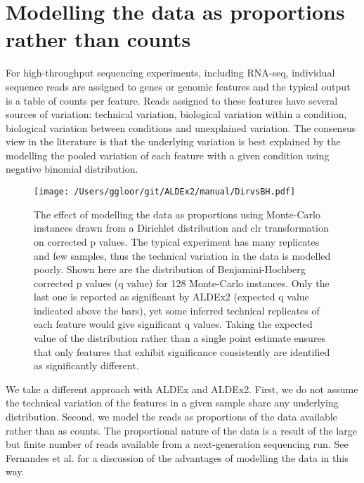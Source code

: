 \documentclass[11pt]{amsart}
\begin{document}
\section{Modelling the data as proportions rather than counts}
For high-throughput sequencing experiments, including RNA-seq, individual sequence reads are assigned to genes or genomic features and the typical output is a table of counts per feature. Reads assigned to these features have several sources of variation: technical variation, biological variation within a condition, biological variation between conditions and unexplained variation. The consensus view in the literature is that the underlying variation is best explained by the modelling the pooled variation of each feature with a given condition using negative binomial distribution. 
\begin{wrapfigure}{r}{0.3\textwidth}\vspace{-1cm}
\vspace{0cm}
\begin{center}
\texttt{[image: /Users/ggloor/git/ALDEx2/manual/DirvsBH.pdf]}
\caption{The effect of modelling the data as proportions using Monte-Carlo instances drawn from a Dirichlet distribution and clr transformation on corrected p values. The typical experiment has many replicates and few samples, thus the technical variation in the data is modelled poorly. Shown here are the distribution of Benjamini-Hochberg corrected p values (q value) for 128 Monte-Carlo instances. Only the last one is reported as significant by ALDEx2 (expected q value indicated above the bars), yet some inferred technical replicates of each feature would give significant q values. Taking the expected value of the distribution rather than a single point estimate ensures that only features that exhibit significance consistently are identified as significantly different.  }
\label{dirvsbh}
\end{center}\vspace{-.5cm}
\end{wrapfigure}
We take a different approach with ALDEx and ALDEx2. First, we do not assume the technical variation of the features in a given sample share any underlying distribution. Second, we model the reads as proportions  of the data available rather than as counts. The proportional nature of the data is a result of the large but finite number of reads available from a next-generation sequencing run. See Fernandes et al.\cite{fernandes:2013} for a discussion of the advantages of modelling the data in this way. 
\end{document}
